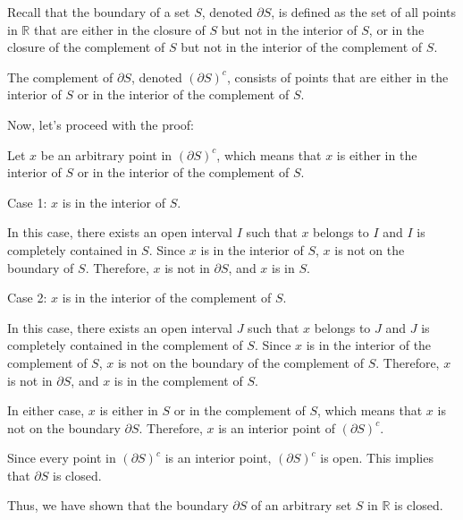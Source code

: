 \documentclass[12pt]{article}
\begin{document}
Recall that the boundary of a set \(S\), denoted \(\partial S\), is defined as the set of all points in \(\mathbb{R}\) that are either in the closure of \(S\) but not in the interior of \(S\), or in the closure of the complement of \(S\) but not in the interior of the complement of \(S\).

The complement of \(\partial S\), denoted \((\partial S)^c\), consists of points that are either in the interior of \(S\) or in the interior of the complement of \(S\).

Now, let's proceed with the proof:

Let \(x\) be an arbitrary point in \((\partial S)^c\), which means that \(x\) is either in the interior of \(S\) or in the interior of the complement of \(S\).

Case 1: \(x\) is in the interior of \(S\).

In this case, there exists an open interval \(I\) such that \(x\) belongs to \(I\) and \(I\) is completely contained in \(S\). Since \(x\) is in the interior of \(S\), \(x\) is not on the boundary of \(S\). Therefore, \(x\) is not in \(\partial S\), and \(x\) is in \(S\).

Case 2: \(x\) is in the interior of the complement of \(S\).

In this case, there exists an open interval \(J\) such that \(x\) belongs to \(J\) and \(J\) is completely contained in the complement of \(S\). Since \(x\) is in the interior of the complement of \(S\), \(x\) is not on the boundary of the complement of \(S\). Therefore, \(x\) is not in \(\partial S\), and \(x\) is in the complement of \(S\).

In either case, \(x\) is either in \(S\) or in the complement of \(S\), which means that \(x\) is not on the boundary \(\partial S\). Therefore, \(x\) is an interior point of \((\partial S)^c\).

Since every point in \((\partial S)^c\) is an interior point, \((\partial S)^c\) is open. This implies that \(\partial S\) is closed.

Thus, we have shown that the boundary \(\partial S\) of an arbitrary set \(S\) in \(\mathbb{R}\) is closed.
\end{document}

